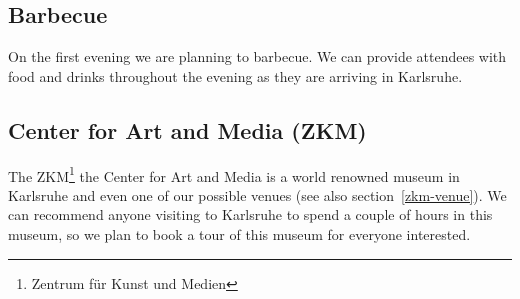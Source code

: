 \begin{multicols}{2}

\subsection{Barbecue}

On the first evening we are planning to barbecue. We can provide attendees with
food and drinks throughout the evening as they are arriving in Karlsruhe.

\subsection{Center for Art and Media (ZKM)}

The ZKM\footnote{Zentrum für Kunst und Medien} the Center for Art and Media is
a world renowned museum in Karlsruhe and even one of our possible venues
(see also section~\ref{zkm-venue}). We can recommend anyone visiting to
Karlsruhe to spend a couple of hours in this museum, so we plan to book a tour
of this museum for everyone interested.



\end{multicols}

\newpage

